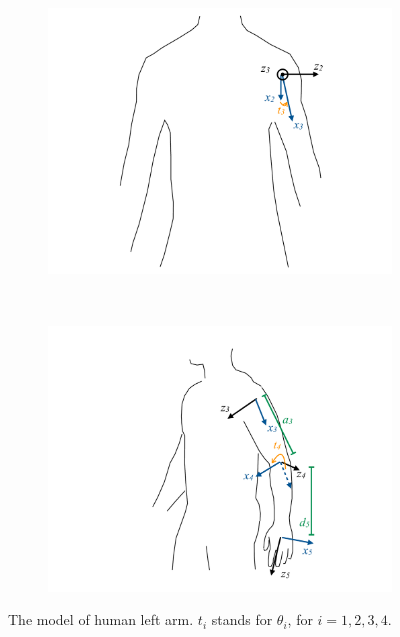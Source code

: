 \documentclass[xcolor=x11names]{article}
\begin{document}
\begin{figure}
    \begin{subfigure}[b]{0.4\textwidth}
        \includegraphics[trim = 50mm 0mm 50mm 0mm, clip, width=\textwidth]{model_3}
        \caption{}
    \end{subfigure}
    ~
    \begin{subfigure}[b]{0.4\textwidth}
        \includegraphics[trim = 50mm 0mm 50mm 0mm, clip, width=\textwidth]{model_4}
        \caption{}
    \end{subfigure}
    \caption{The model of human left arm. $t_i$ stands for $\theta_i$, for $i=1,2,3,4$.}
    \label{fig:model}
\end{figure}
\end{document}
